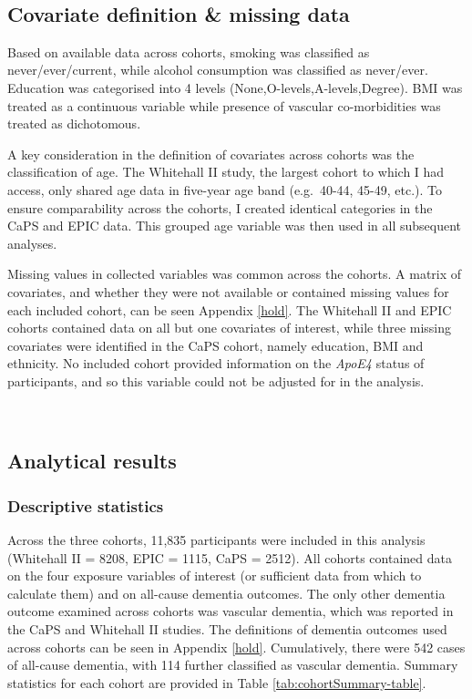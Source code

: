 \documentclass[a4paper, twoside]{templates/ociamthesis}
\begin{document}
~

\hypertarget{ipd-covar-definition}{%
\subsection{Covariate definition \& missing data}\label{ipd-covar-definition}}

Based on available data across cohorts, smoking was classified as never/ever/current, while alcohol consumption was classified as never/ever. Education was categorised into 4 levels (None,O-levels,A-levels,Degree). BMI was treated as a continuous variable while presence of vascular co-morbidities was treated as dichotomous.

A key consideration in the definition of covariates across cohorts was the classification of age. The Whitehall II study, the largest cohort to which I had access, only shared age data in five-year age band (e.g.~40-44, 45-49, etc.). To ensure comparability across the cohorts, I created identical categories in the CaPS and EPIC data. This grouped age variable was then used in all subsequent analyses.

Missing values in collected variables was common across the cohorts. A matrix of covariates, and whether they were not available or contained missing values for each included cohort, can be seen Appendix \ref{hold}. The Whitehall II and EPIC cohorts contained data on all but one covariates of interest, while three missing covariates were identified in the CaPS cohort, namely education, BMI and ethnicity. No included cohort provided information on the \emph{ApoE4} status of participants, and so this variable could not be adjusted for in the analysis.

~

\hypertarget{analytical-results}{%
\subsection{Analytical results}\label{analytical-results}}

\hypertarget{descriptive-statistics}{%
\subsubsection{Descriptive statistics}\label{descriptive-statistics}}

Across the three cohorts, 11,835 participants were included in this analysis (Whitehall II = 8208, EPIC = 1115, CaPS = 2512). All cohorts contained data on the four exposure variables of interest (or sufficient data from which to calculate them) and on all-cause dementia outcomes. The only other dementia outcome examined across cohorts was vascular dementia, which was reported in the CaPS and Whitehall II studies. The definitions of dementia outcomes used across cohorts can be seen in Appendix \ref{hold}. Cumulatively, there were 542 cases of all-cause dementia, with 114 further classified as vascular dementia. Summary statistics for each cohort are provided in Table \ref{tab:cohortSummary-table}.
\end{document}
